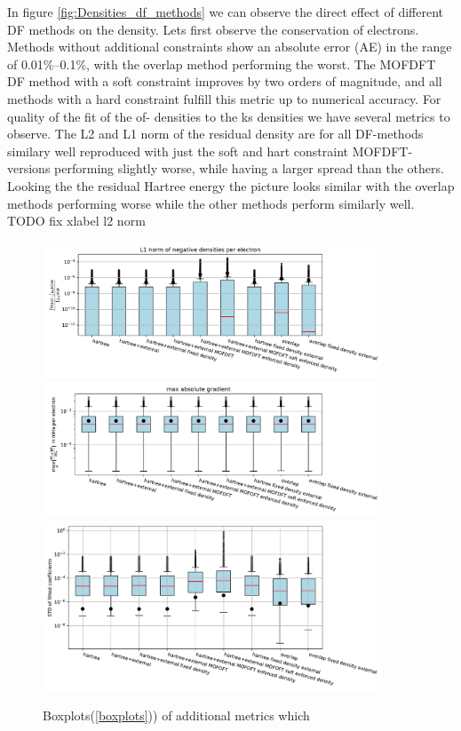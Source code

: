 In figure \ref{fig:Densities_df_methods} we can observe the direct effect of different DF methods on the density. Lets first observe the conservation of electrons. Methods without additional constraints show an absolute error (AE) in the range of 0.01\%–0.1\%, with the overlap method performing the worst. The MOFDFT DF method with a soft constraint improves by two orders of magnitude, and all methods with a hard constraint fulfill this metric up to numerical accuracy. For quality of the fit of the of- densities to the ks densities we have several metrics to observe. The L2 and L1 norm of the residual density are for all DF-methods similary well reproduced with just the soft and hart constraint MOFDFT-versions performing slightly worse, while having a larger spread than the others. Looking the the residual Hartree energy the picture looks similar with the overlap methods performing worse while the other methods perform similarly well.
TODO fix xlabel l2 norm
\begin{figure}
    \includegraphics[width=0.9\textwidth]{chapters/results/results_images/L1_negative_densities_on_even_tempered_2.5_for_different_df_methods}
    \includegraphics[width=0.9\textwidth]{chapters/results/results_images/max_abs_gradient_on_even_tempered_2.5_for_different_df_methods}
    \includegraphics[width=0.9\textwidth]{chapters/results/results_images/var_density_fitting}
    \caption{Boxplots(\ref{boxplots})) of additional metrics which }
    \label{fig:other_df_metrics}
\end{figure}
